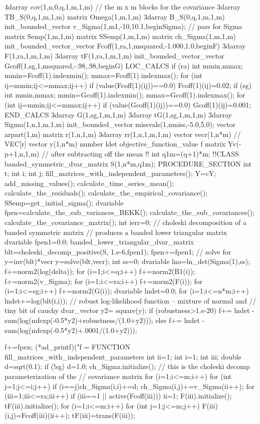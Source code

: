   4darray cov(1,n,0,q,1,m,1,m)  // the m x m blocks for the covariance
  3darray TB_S(0,q,1,m,1,m)
  matrix Omega(1,m,1,m)
  3darray B_S(0,q,1,m,1,m)
  init_bounded_vector v_Sigma(1,m1,-10,10.1,beginSigma);  // pars for Sigma
  matrix Semp(1,m,1,m)  
  matrix SSemp(1,m,1,m)  
  matrix ch_Sigma(1,m,1,m)  
  init_bounded_vector_vector Fcoff(1,ra,1,msquared,-1.000,1.0,beginF)  
  3darray F(1,ra,1,m,1,m)  
  3darray tF(1,ra,1,m,1,m)  
  init_bounded_vector_vector Gcoff(1,sg,1,msquared,-.98,.98,beginG)  
 LOC_CALCS
  if (ra)
  {
    int mmin,mmax;
    mmin=Fcoff(1).indexmin();
    mmax=Fcoff(1).indexmax();
    for (int ij=mmin;ij<=mmax;ij++) if (value(Fcoff(1)(ij))==0.0) 
      Fcoff(1)(ij)=0.02;
  }
  if (sg)
  {
    int mmin,mmax;
    mmin=Gcoff(1).indexmin();
    mmax=Gcoff(1).indexmax();
    for (int ij=mmin;ij<=mmax;ij++) if (value(Gcoff(1)(ij))==0.0) 
      Gcoff(1)(ij)=0.001;
  }
 END_CALCS
  3darray G(1,sg,1,m,1,m)  
  3darray tG(1,sg,1,m,1,m)  
  3darray Sigma(1,n,1,m,1,m)  
  init_bounded_vector missvals(1,nmiss,-5.0,5.0);
  vector arpart(1,m)
  matrix r(1,n,1,m)
  3darray rr(1,n,1,m,1,m)
  vector vecr(1,n*m)   // VEC[r]
  vector y(1,n*m)
  number ldet
  objective_function_value f
  matrix Yv(-p+1,n,1,m)  // after subtracting off the mean
 !! int q1m=(q+1)*m; 
 !!CLASS  banded_symmetric_dvar_matrix S(1,n*m,q1m);
PROCEDURE_SECTION
  int t; int i; int j;
  fill_matrices_with_independent_parameters();
  Y=cY;
  add_missing_values();
  calculate_time_series_mean();
  calculate_the_residuals(); 
  calculate_the_empirical_covariance();
  SSemp=get_initial_sigma();
  dvariable fpen=calculate_the_sub_variances_BEKK();
  calculate_the_sub_covariances();
  calculate_the_covariance_matrix();
  int ierr=0;
  // choleski decomposition of a banded symmetric matrix
  // produces a banded lower triangular matrix
  dvariable fpen1=0.0;
  banded_lower_triangular_dvar_matrix blt=choleski_decomp_positive(S,
    1.e-6,fpen1);
  fpen+=fpen1;
  // solve for y=inv(blt)*vecr
  y=solve(blt,vecr);
  int ss=0;
  dvariable lno=ln_det(Sigma(1),ss);
  f+=norm2(log(delta));
  for (i=1;i<=q;i++) f+=norm2(B1(i));
  f+=norm2(v_Sigma);
  for (i=1;i<=ra;i++) f+=norm2(F(i));
  for (i=1;i<=sg;i++) f+=norm2(G(i));
  dvariable lndet=0.0;
  for (i=1;i<=n*m;i++) lndet+=log(blt(i,i)); 
  // robust log-likelihood function -- mixture of normal and 
  // tiny bit of cauchy 
  dvar_vector y2= square(y);
  if (robustness>1.e-20)  
    f+= lndet - sum(log(mfexp(-0.5*y2)+robustness/(1.0+y2)));
  else
    f+= lndet - sum(log(mfexp(-0.5*y2)+.0001/(1.0+y2)));

  f+=fpen;
  (*ad_printf)("f = %
FUNCTION fill_matrices_with_independent_parameters
  int ii=1; int i=1; int iii;
  double d=sqrt(0.1);
  if  (!sg) d=1.0;
  ch_Sigma.initialize();
  // this is the choleski decomp parameterization of the
  // covariance matrix
  for (i=1;i<=m;i++) 
    for (int j=1;j<=i;j++) {
      if (i==j)ch_Sigma(i,i)+=d;
      ch_Sigma(i,j)+=v_Sigma(ii++);
    }   
  for (iii=1;iii<=ra;iii++) {
    if (iii==1 || active(Fcoff(iii))) {
      ii=1;
      F(iii).initialize();
      tF(iii).initialize();
      for (i=1;i<=m;i++) {
        for (int j=1;j<=m;j++) 
          F(iii)(i,j)=Fcoff(iii)(ii++);
      }
    }
    tF(iii)=trans(F(iii));
  } 

